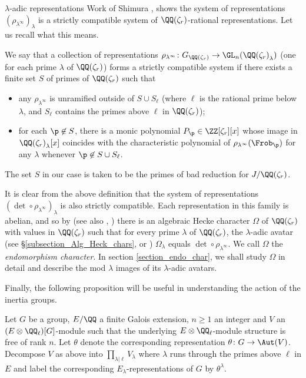 \documentclass[11pt,a4paper]{article}
\newcommand{\Qr}{{\QQ(\zeta_r)}}
\newcommand{\Zr}{{\ZZ[\zeta_r]}}
\newcommand{\GQr}{G_{\QQ(\zeta_{r})}}
\begin{document}
\begin{section}{$\lambda$-adic representations}
Work of Shimura \cite[\S 11.10]{shimura_ANF}, \cite[Thm 2.1.2]{ribet_RM} shows the system of representations $(\rho_{\lambda^\infty})_\lambda$ is a strictly compatible system of $\Qr$-rational representations. Let us recall what this means.
\begin{definition}
We say that a collection of representations $\rho_{\lambda^\infty}\colon \GQr \rightarrow \GL_n(\Qr_\lambda)$ (one for each prime $\lambda$ of $\Qr$) forms a strictly compatible system if there exists a finite set $S$ of primes of $\Qr$ such that
\begin{itemize}
    \item  any $\rho_{\lambda^\infty}$ is unramified outside of $S\cup S_\ell$ (where $\ell$ is the rational prime below $\lambda$, and $S_\ell$ contains the primes above $\ell$ in $\Qr$);
    \item for each $\p \not \in S$, there is a monic polynomial $P_\p \in \Zr[x]$ whose image in $\Qr_\lambda[x]$ coincides with the characteristic polynomial of $\rho_{\lambda^\infty}(\Frob_\p)$ for any $\lambda$ whenever $\p \not \in S \cup S_\ell$.
\end{itemize}
\end{definition}
The set $S$ in our case is taken to be the primes of bad reduction for $J/\Qr$.

It is clear from the above definition that the system of  representations $(\det \circ \rho_{\lambda^\infty})_\lambda$ is also strictly compatible.
Each representation in this family is abelian, and so by \cite[\S 1.1, Prop 1.4]{Periods_of_Hecke_characters} (see also \cite[Thm 2.13]{ribet_RM}, \cite[Main Thm]{Henniart}) there is an algebraic Hecke character $\Omega$ of $\Qr$ with values in $\Qr$ such that for every prime $\lambda$ of $\Qr$,  the $\lambda$-adic avatar (see \S\ref{subsection_Alg_Heck_chars}, or \cite[\S0.5]{Periods_of_Hecke_characters}) $\Omega_\lambda $ equals $ \det \circ\rho_{\lambda^\infty}$. We call $\Omega$ the \emph{endomorphism character}. In section \ref{section_endo_char}, we shall study $\Omega$ in detail and describe the mod $\lambda$ images of its $\lambda$-adic avatars.


Finally, the following proposition will be useful in understanding the action of the inertia groups.

\begin{proposition}
\label{prop:rationality_andlambda_adicreps}
    Let $G$ be a group,  $E/\QQ$ a finite Galois extension, $n \geq 1$ an integer and $V$ an  $(E\otimes \QQ_\ell)[G]$-module such that the underlying $E\otimes \QQ_\ell$-module structure is free of rank $n$.
    Let $\theta$ denote the corresponding representation $\theta \colon G \rightarrow \Aut(V)$.
    Decompose $V$ as above into $\prod_{\lambda |\ell} V_\lambda$ where $\lambda$ runs through the primes above $\ell$ in $E$ and label the corresponding $E_\lambda$-representations of $G$ by $\theta^\lambda$.


\end{proposition}
\end{section}
\end{document}
